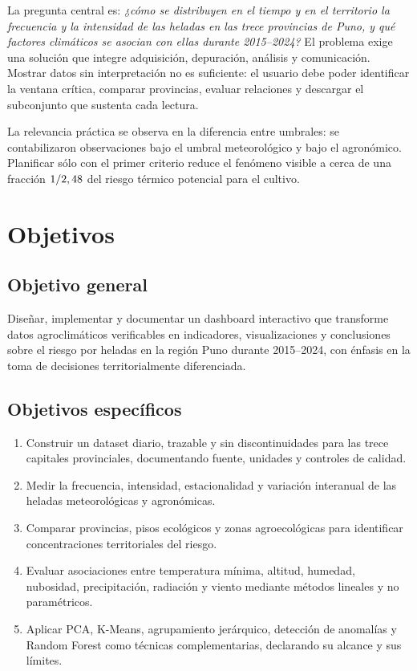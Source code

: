 \documentclass[11pt,a4paper]{article}
\begin{document}
La pregunta central es: \emph{¿cómo se distribuyen en el tiempo y en el territorio la
frecuencia y la intensidad de las heladas en las trece provincias de Puno, y qué factores
climáticos se asocian con ellas durante 2015--2024?} El problema exige una solución que
integre adquisición, depuración, análisis y comunicación. Mostrar datos sin interpretación
no es suficiente: el usuario debe poder identificar la ventana crítica, comparar
provincias, evaluar relaciones y descargar el subconjunto que sustenta cada lectura.

La relevancia práctica se observa en la diferencia entre umbrales: se contabilizaron
\NHeladas{} observaciones bajo el umbral meteorológico y \NHeladasAgronomicas{} bajo el
agronómico. Planificar sólo con el primer criterio reduce el fenómeno visible a cerca de
una fracción $1/2,48{}$ del riesgo térmico potencial para el cultivo.

\section{Objetivos}

\subsection{Objetivo general}

Diseñar, implementar y documentar un dashboard interactivo que transforme datos
agroclimáticos verificables en indicadores, visualizaciones y conclusiones sobre el riesgo
por heladas en la región Puno durante 2015--2024, con énfasis en la toma de decisiones
territorialmente diferenciada.

\subsection{Objetivos específicos}

\begin{enumerate}
  \item Construir un dataset diario, trazable y sin discontinuidades para las trece
        capitales provinciales, documentando fuente, unidades y controles de calidad.
  \item Medir la frecuencia, intensidad, estacionalidad y variación interanual de las
        heladas meteorológicas y agronómicas.
  \item Comparar provincias, pisos ecológicos y zonas agroecológicas para identificar
        concentraciones territoriales del riesgo.
  \item Evaluar asociaciones entre temperatura mínima, altitud, humedad, nubosidad,
        precipitación, radiación y viento mediante métodos lineales y no paramétricos.
  \item Aplicar PCA, K-Means, agrupamiento jerárquico, detección de anomalías y Random
        Forest como técnicas complementarias, declarando su alcance y sus límites.
\end{enumerate}
\end{document}
